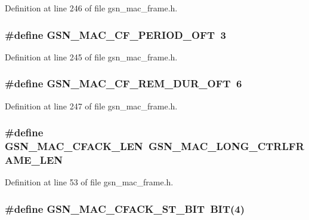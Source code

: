 Definition at line 246 of file gsn\_\-mac\_\-frame.h.

\hypertarget{a00523_a95e25f9f091091290acb44b335ff8849}{
\subsubsection[{GSN\_\-MAC\_\-CF\_\-PERIOD\_\-OFT}]{\setlength{\rightskip}{0pt plus 5cm}\#define GSN\_\-MAC\_\-CF\_\-PERIOD\_\-OFT~3}}
\label{a00523_a95e25f9f091091290acb44b335ff8849}


Definition at line 245 of file gsn\_\-mac\_\-frame.h.

\hypertarget{a00523_a9c409211ed4d2ad4d4c15d9e9fe717c9}{
\subsubsection[{GSN\_\-MAC\_\-CF\_\-REM\_\-DUR\_\-OFT}]{\setlength{\rightskip}{0pt plus 5cm}\#define GSN\_\-MAC\_\-CF\_\-REM\_\-DUR\_\-OFT~6}}
\label{a00523_a9c409211ed4d2ad4d4c15d9e9fe717c9}


Definition at line 247 of file gsn\_\-mac\_\-frame.h.

\hypertarget{a00523_aa27491b093780af77bdfb83de8b8e1eb}{
\subsubsection[{GSN\_\-MAC\_\-CFACK\_\-LEN}]{\setlength{\rightskip}{0pt plus 5cm}\#define GSN\_\-MAC\_\-CFACK\_\-LEN~GSN\_\-MAC\_\-LONG\_\-CTRLFRAME\_\-LEN}}
\label{a00523_aa27491b093780af77bdfb83de8b8e1eb}


Definition at line 53 of file gsn\_\-mac\_\-frame.h.

\hypertarget{a00523_a9d7b1fb963148277b675a34a5665b056}{
\subsubsection[{GSN\_\-MAC\_\-CFACK\_\-ST\_\-BIT}]{\setlength{\rightskip}{0pt plus 5cm}\#define GSN\_\-MAC\_\-CFACK\_\-ST\_\-BIT~BIT(4)}}
\label{a00523_a9d7b1fb963148277b675a34a5665b056}


